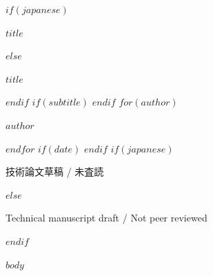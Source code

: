 \documentclass[11pt,a4paper]{article}
\begin{document}
\thispagestyle{plain}
\begin{center}
$if(japanese)$
{\fontsize{19}{27}\selectfont\bfseries $title$\par}
$else$
{\fontsize{21}{25}\selectfont\bfseries $title$\par}
$endif$
$if(subtitle)$
\vspace{5pt}{\large $subtitle$\par}
$endif$
\vspace{10pt}
$for(author)$
{\normalsize $author$\par}
$endfor$
$if(date)$
\vspace{3pt}{\small $date$\par}
$endif$
\vspace{5pt}
$if(japanese)$
{\small\sffamily\color{Muted} 技術論文草稿 / 未査読\par}
$else$
{\small\sffamily\color{Muted} Technical manuscript draft / Not peer reviewed\par}
$endif$
\end{center}
\vspace{3pt}
$body$
\end{document}

